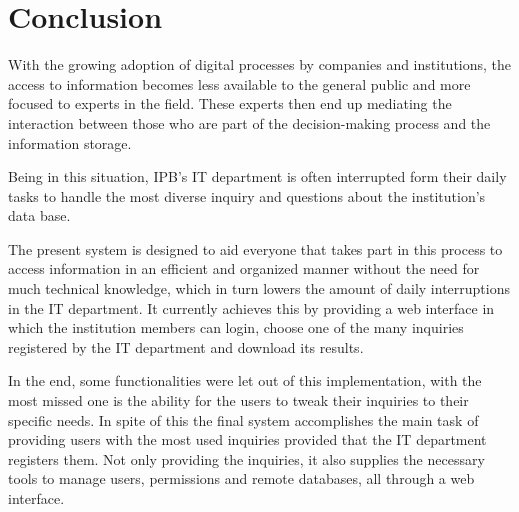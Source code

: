 \chapter{Conclusion}

With the growing adoption of digital processes by companies and institutions, the access to information becomes less available to the general public and more focused to experts in the field. These experts then end up mediating the interaction between those who are part of the decision-making process and the information storage.

Being in this situation, \gls{IPB}'s \gls{IT} department is often interrupted form their daily tasks to handle the most diverse inquiry and questions about the institution's data base.

The present system is designed to aid everyone that takes part in this process to access information in an efficient and organized manner without the need for much technical knowledge, which in turn lowers the amount of daily interruptions in the \gls{IT} department.
It currently achieves this by providing a web interface in which the institution members can login, choose one of the many inquiries registered by the \gls{IT} department and download its results.

In the end, some functionalities were let out of this implementation, with the most missed one is the ability for the users to tweak their inquiries to their specific needs.
In spite of this the final system accomplishes the main task of providing users with the most used inquiries provided that the \gls{IT} department registers them. Not only providing the inquiries, it also supplies the necessary tools to manage users, permissions and remote databases, all through a web interface.